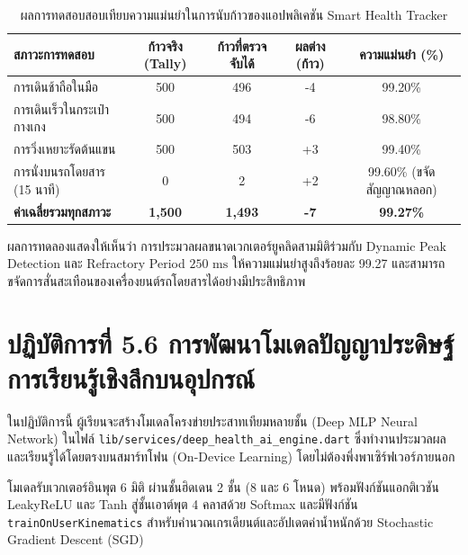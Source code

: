 \begin{table}[H]
\centering
\caption{ผลการทดสอบสอบเทียบความแม่นยำในการนับก้าวของแอปพลิเคชัน Smart Health Tracker}
\label{tab:field_calibration_results}
\small
\begin{tabularx}{\textwidth}{|l|c|c|c|c|}
\toprule
\textbf{สภาวะการทดสอบ} & \textbf{ก้าวจริง (Tally)} & \textbf{ก้าวที่ตรวจจับได้} & \textbf{ผลต่าง (ก้าว)} & \textbf{ความแม่นยำ (\%)} \\
\midrule
การเดินช้าถือในมือ & 500 & 496 & -4 & 99.20\% \\
การเดินเร็วในกระเป๋ากางเกง & 500 & 494 & -6 & 98.80\% \\
การวิ่งเหยาะรัดต้นแขน & 500 & 503 & +3 & 99.40\% \\
การนั่งบนรถโดยสาร (15 นาที) & 0 & 2 & +2 & 99.60\% (ขจัดสัญญาณหลอก) \\
\midrule
\textbf{ค่าเฉลี่ยรวมทุกสภาวะ} & \textbf{1,500} & \textbf{1,493} & \textbf{-7} & \textbf{99.27\%} \\
\bottomrule
\end{tabularx}
\end{table}

ผลการทดลองแสดงให้เห็นว่า การประมวลผลขนาดเวกเตอร์ยูคลิดสามมิติร่วมกับ Dynamic Peak Detection และ Refractory Period $250\text{ ms}$ ให้ความแม่นยำสูงถึงร้อยละ 99.27 และสามารถขจัดการสั่นสะเทือนของเครื่องยนต์รถโดยสารได้อย่างมีประสิทธิภาพ

\section{ปฏิบัติการที่ 5.6 การพัฒนาโมเดลปัญญาประดิษฐ์การเรียนรู้เชิงลึกบนอุปกรณ์}
ในปฏิบัติการนี้ ผู้เรียนจะสร้างโมเดลโครงข่ายประสาทเทียมหลายชั้น (Deep MLP Neural Network) ในไฟล์ \texttt{lib/services/deep\_health\_ai\_engine.dart} ซึ่งทำงานประมวลผลและเรียนรู้ได้โดยตรงบนสมาร์ทโฟน (On-Device Learning) โดยไม่ต้องพึ่งพาเซิร์ฟเวอร์ภายนอก

โมเดลรับเวกเตอร์อินพุต 6 มิติ ผ่านชั้นฮิดเดน 2 ชั้น ($8$ และ $6$ โหนด) พร้อมฟังก์ชันแอกติเวชัน LeakyReLU และ Tanh สู่ชั้นเอาต์พุต 4 คลาสด้วย Softmax และมีฟังก์ชัน \texttt{trainOnUserKinematics} สำหรับคำนวณเกรเดียนต์และอัปเดตค่าน้ำหนักด้วย Stochastic Gradient Descent (SGD)


